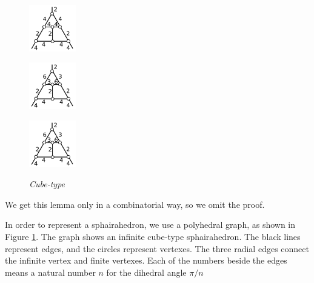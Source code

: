 \documentclass[suppldata, dvipdfmx]{interact}
\theoremstyle{plain}%
\theoremstyle{definition}
\theoremstyle{remark}
\theoremstyle{problemstyle}
\begin{document}
\begin{figure}[h!tbp]
\begin{minipage}[t]{0.75\textwidth}
\begin{minipage}[t]{0.15\textwidth}
   \subcaption{}
   \label{}
  \end{minipage}
 \hspace*{\fill}
  \begin{minipage}[t]{0.15\textwidth}
   \centering
   \includegraphics[width=0.8in, keepaspectratio]{./img/HexahedraWithSphericalFaces/cube/cube_i.png}
   \subcaption{}
   \label{fig:}
  \end{minipage}
 \hspace*{\fill}
  \begin{minipage}[t]{0.15\textwidth}
   \centering
   \includegraphics[width=0.8in, keepaspectratio]{./img/HexahedraWithSphericalFaces/cube/cube_j.png}
   \subcaption{}
   \label{fig:}
  \end{minipage}
 \hspace*{\fill}
  \begin{minipage}[t]{0.15\textwidth}
   \centering
   \includegraphics[width=0.8in, keepaspectratio]{./img/HexahedraWithSphericalFaces/cube/cube_k.png}
   \subcaption{} %
   \label{fig:}
  \end{minipage}
 \hspace*{\fill}
  \caption{\textit{Cube-type}}
  \label{fig:cubeGraph}
 \end{minipage}
\end{figure}

We get this lemma only in a combinatorial way, so we omit the proof.

In order to represent a sphairahedron, we use a polyhedral graph, as
shown in Figure \ref{fig:cubeGraph}. The graph shows an infinite cube-type sphairahedron.
The black lines represent edges, and the circles represent
vertexes. The three radial edges connect the infinite vertex and finite
vertexes. Each of the numbers beside 
the edges means a natural number $n$ for the dihedral angle $\pi / n$
\end{document}
